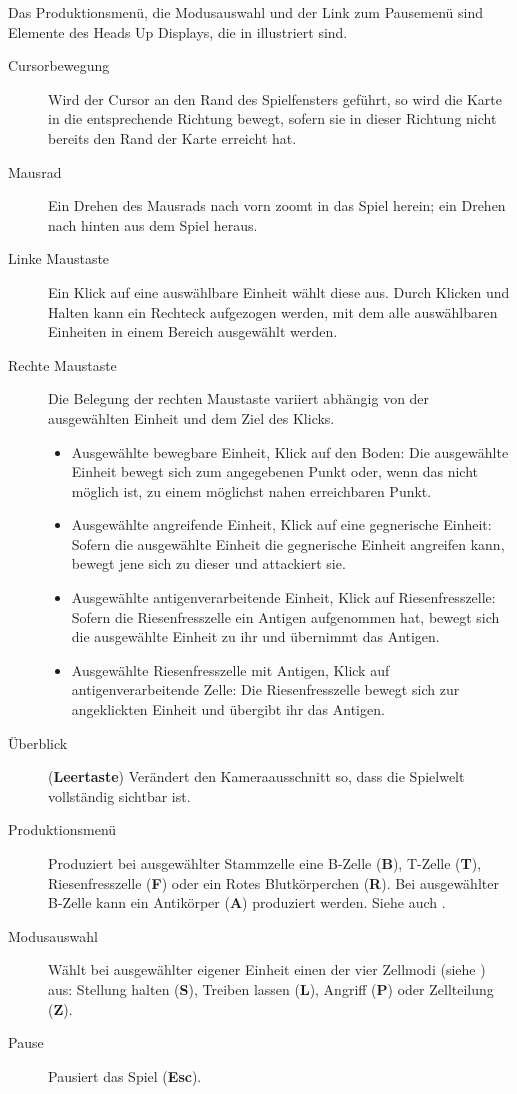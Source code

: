 Das Produktionsmenü, die Modusauswahl und der Link zum Pausemenü sind
Elemente des Heads Up Displays, die in  illustriert sind.

\newcommand*{\shortcut}[1]{\textbf{#1}}

\begin{description}
  \item[Cursorbewegung] Wird der Cursor an den Rand des Spielfensters
    geführt, so wird die Karte in die entsprechende Richtung bewegt, sofern
    sie in dieser Richtung nicht bereits den Rand der Karte erreicht hat.
  \item[Mausrad] Ein Drehen des Mausrads nach vorn zoomt in das Spiel herein;
    ein Drehen nach hinten aus dem Spiel heraus.
  \item[Linke Maustaste] Ein Klick auf eine auswählbare Einheit wählt diese
    aus. Durch Klicken und Halten kann ein Rechteck aufgezogen werden, mit
    dem alle auswählbaren Einheiten in einem Bereich ausgewählt werden.
  \item[Rechte Maustaste]
    Die Belegung der rechten Maustaste variiert abhängig von der ausgewählten
    Einheit und dem Ziel des Klicks.
    \begin{itemize}
      \item Ausgewählte bewegbare Einheit, Klick auf den Boden: Die ausgewählte
        Einheit bewegt sich zum angegebenen Punkt oder, wenn das nicht
        möglich ist, zu einem möglichst nahen erreichbaren Punkt.
      \item Ausgewählte angreifende Einheit, Klick auf eine gegnerische Einheit:
        Sofern die ausgewählte Einheit die gegnerische Einheit angreifen kann,
        bewegt jene sich zu dieser und attackiert sie.
      \item Ausgewählte antigenverarbeitende Einheit, Klick auf Riesenfresszelle:
        Sofern die Riesenfresszelle ein Antigen aufgenommen hat, bewegt sich
        die ausgewählte Einheit zu ihr und übernimmt das Antigen.
      \item Ausgewählte Riesenfresszelle mit Antigen, Klick auf
        antigenverarbeitende Zelle: Die Riesenfresszelle bewegt sich zur
        angeklickten Einheit und übergibt ihr das Antigen.
    \end{itemize}
  \item[Überblick] (\shortcut{Leertaste}) Verändert den Kameraausschnitt so,
    dass die Spielwelt vollständig sichtbar ist.
  \item[Produktionsmenü] Produziert bei ausgewählter Stammzelle eine
    B-Zelle (\shortcut{B}), T-Zelle (\shortcut{T}), Riesenfresszelle
    (\shortcut{F}) oder ein Rotes Blutkörperchen (\shortcut{R}). Bei
    ausgewählter B-Zelle kann ein Antikörper (\shortcut{A}) produziert werden.
    Siehe auch .
  \item[Modusauswahl] Wählt bei ausgewählter eigener Einheit einen der vier
    Zellmodi (siehe ) aus: Stellung halten (\shortcut{S}),
    Treiben lassen (\shortcut{L}), Angriff (\shortcut{P}) oder Zellteilung
    (\shortcut{Z}).
  \item[Pause] Pausiert das Spiel (\shortcut{Esc}).
\end{description}

